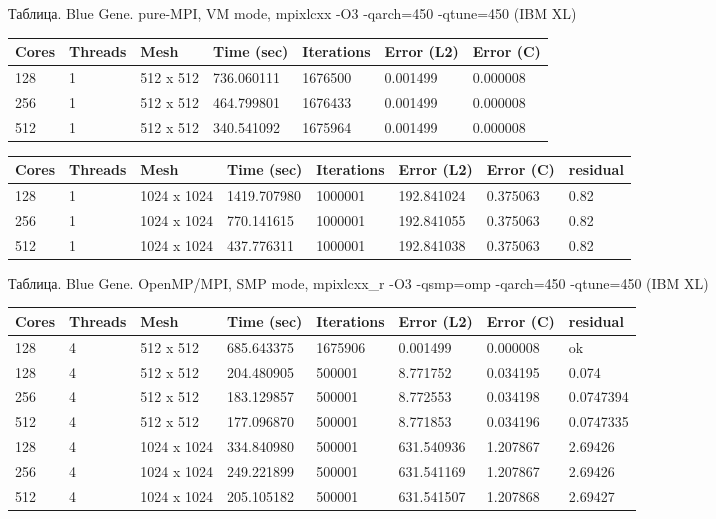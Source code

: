 \documentclass[12pt]{article}
\begin{document}
Таблица. Blue Gene. pure-MPI, VM mode, mpixlcxx -O3 -qarch=450 -qtune=450 (IBM XL)
\begin{center}
\begin{tabular}{lllllll}
Cores & Threads & Mesh & Time (sec) & Iterations & Error (L2) & Error (C) \\
\hline
128 & 1 & 512 x 512 & 736.060111 & 1676500 & 0.001499 & 0.000008  \\	
256 & 1 & 512 x 512 & 464.799801 & 1676433 & 0.001499 & 0.000008  \\
512 & 1 & 512 x 512 & 340.541092 & 1675964 & 0.001499 & 0.000008  \\
\hline
\end{tabular}
\end{center}

\begin{center}
\begin{tabular}{llllllll}
Cores & Threads & Mesh & Time (sec) & Iterations & Error (L2) & Error (C) & residual \\
\hline
128 & 1 & 1024 x 1024 & 1419.707980 & 1000001 & 192.841024 & 0.375063 & 0.82 \\
256 & 1 & 1024 x 1024 & 770.141615 & 1000001 & 192.841055 & 0.375063 & 0.82 \\
512 & 1 & 1024 x 1024 & 437.776311 & 1000001 & 192.841038 & 0.375063 & 0.82 \\
\hline
\end{tabular}
\end{center}

Таблица. Blue Gene. OpenMP/MPI, SMP mode, mpixlcxx\_r -O3 -qsmp=omp -qarch=450 -qtune=450 (IBM XL)
\begin{center}
\begin{tabular}{llllllll}
Cores & Threads & Mesh & Time (sec) & Iterations & Error (L2) & Error (C) & residual \\
\hline
128 & 4 & 512 x 512 & 685.643375 & 1675906 & 0.001499 & 0.000008 & ok \\
\hline
128 & 4 & 512 x 512 & 204.480905 & 500001 & 8.771752 & 0.034195 & 0.074 \\
256 & 4 & 512 x 512 & 183.129857 & 500001 & 8.772553 & 0.034198 & 0.0747394 \\
512 & 4 & 512 x 512 & 177.096870 & 500001 & 8.771853 & 0.034196 & 0.0747335 \\
\hline
128 & 4 & 1024 x 1024 & 334.840980 & 500001 & 631.540936 & 1.207867 & 2.69426 \\
256 & 4 & 1024 x 1024 & 249.221899 & 500001 & 631.541169 & 1.207867 & 2.69426 \\
512 & 4 & 1024 x 1024 & 205.105182 & 500001 & 631.541507 & 1.207868 & 2.69427 \\
\hline
\end{tabular}
\end{center}
\end{document}
